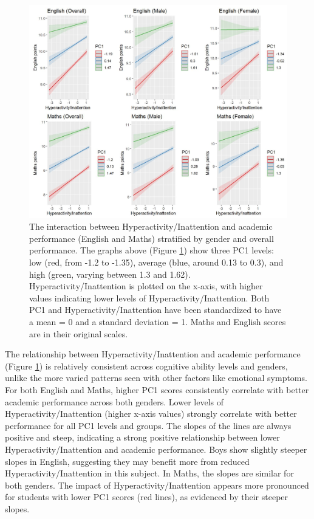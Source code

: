 \documentclass[12pt,a4paper,onecolumn]{article}
\numberwithin{equation}{section}
\begin{document}
\begin{figure}[ht] 
    \centering
    \includegraphics[width=1\linewidth]{AVE_SDQ_Hyper.JPG}
    \caption{The interaction between Hyperactivity/Inattention and academic performance (English and Maths) stratified by gender and overall performance. The graphs above (Figure \ref{Fig3}) show three PC1 levels: low (red, from -1.2 to -1.35), average (blue, around 0.13 to 0.3), and high (green, varying between 1.3 and 1.62). Hyperactivity/Inattention is plotted on the x-axis, with higher values indicating lower levels of Hyperactivity/Inattention. Both PC1 and Hyperactivity/Inattention have been standardized to have a mean = 0 and a standard deviation = 1. Maths and English scores are in their original scales.}
    \label{Fig3}
\end{figure}

The relationship between Hyperactivity/Inattention and academic performance (Figure \ref{Fig3}) is relatively consistent across cognitive ability levels and genders, unlike the more varied patterns seen with other factors like emotional symptoms.
For both English and Maths, higher PC1 scores consistently correlate with better academic performance across both genders. Lower levels of Hyperactivity/Inattention (higher x-axis values) strongly correlate with better performance for all PC1 levels and groups. The slopes of the lines are always positive and steep, indicating a strong positive relationship between lower Hyperactivity/Inattention and academic performance. Boys show slightly steeper slopes in English, suggesting they may benefit more from reduced Hyperactivity/Inattention in this subject.
In Maths, the slopes are similar for both genders. The impact of Hyperactivity/Inattention appears more pronounced for students with lower PC1 scores (red lines), as evidenced by their steeper slopes.
\end{document}
